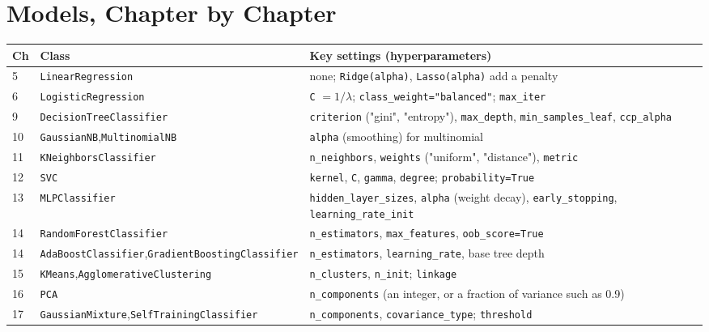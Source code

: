 \section{Models, Chapter by Chapter}

\begin{longtable}{@{}L{1.1cm}L{5.0cm}L{8.9cm}@{}}
\toprule
{}
\textbf{Ch} & \textbf{Class} & \textbf{Key settings (hyperparameters)} \\
\midrule
{} & \texttt{LinearRegression} & none; \texttt{Ridge(alpha)}, \texttt{Lasso(alpha)} add a penalty \\
6 & \texttt{LogisticRegression} & \texttt{C} $= 1/\lambda$; \texttt{class\_weight="balanced"}; \texttt{max\_iter} \\
9 & \texttt{DecisionTreeClassifier} & \texttt{criterion} ("gini", "entropy"), \texttt{max\_depth}, \texttt{min\_samples\_leaf}, \texttt{ccp\_alpha} \\
10 & \texttt{GaussianNB},\newline \texttt{MultinomialNB} &\texttt{alpha} (smoothing) for multinomial \\
11 & \texttt{KNeighborsClassifier} & \texttt{n\_neighbors}, \texttt{weights} ("uniform", "distance"), \texttt{metric} \\
12 & \texttt{SVC} & \texttt{kernel}, \texttt{C}, \texttt{gamma}, \texttt{degree}; \texttt{probability=True} \\
13 & \texttt{MLPClassifier} & \texttt{hidden\_layer\_sizes}, \texttt{alpha} (weight decay), \texttt{early\_stopping}, \texttt{learning\_rate\_init} \\
14 & \texttt{RandomForestClassifier} & \texttt{n\_estimators}, \texttt{max\_features}, \texttt{oob\_score=True} \\
14 & \texttt{AdaBoostClassifier},\newline \texttt{GradientBoostingClassifier} &\texttt{n\_estimators}, \texttt{learning\_rate}, base tree depth \\
15 & \texttt{KMeans},\newline \texttt{AgglomerativeClustering} &\texttt{n\_clusters}, \texttt{n\_init}; \texttt{linkage} \\
16 & \texttt{PCA} & \texttt{n\_components} (an integer, or a fraction of variance such as 0.9) \\
17 & \texttt{GaussianMixture},\newline \texttt{SelfTrainingClassifier} &\texttt{n\_components}, \texttt{covariance\_type}; \texttt{threshold} \\
\bottomrule
\end{longtable}

